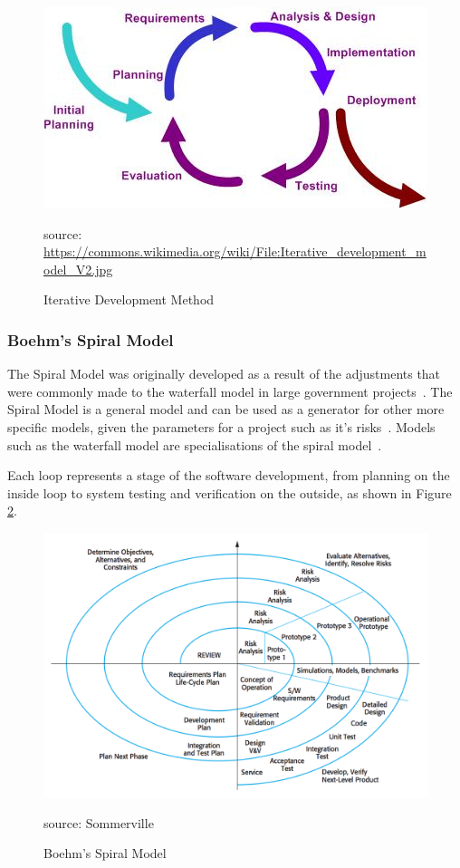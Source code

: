 \documentclass{article}
\begin{document}
\begin{figure}[htb] 
\centering
    \includegraphics[width=0.8\linewidth]{iterativeDevelopment}
\caption{Iterative Development Method}
\small source: \url{https://commons.wikimedia.org/wiki/File:Iterative_development_model_V2.jpg}
\label{fig:iterativeDevelopment}
\end{figure}

\subsubsection{Boehm's Spiral Model}
The Spiral Model was originally developed as a result of the adjustments that were commonly made to the waterfall model in large government projects~\cite{spiralModelSoftwareDevelopment}.  The Spiral Model is a general model and can be used as a generator for other more specific models, given the parameters for a project such as it's risks~\cite{boehm2000spiral}.  Models such as the waterfall model are specialisations of the spiral model~\cite{boehm2000spiral}.

Each loop represents a stage of the software development, from planning on the inside loop to system testing and verification on the outside, as shown in Figure \ref{fig:spiralModel}.

\begin{figure}[htb] 
\centering
    \includegraphics[width=0.8\linewidth]{spiralModel}
\caption{Boehm's Spiral Model}
\small source: Sommerville~\cite{sommervilleSoftwareEngineering}
\label{fig:spiralModel}
\end{figure}
\end{document}
